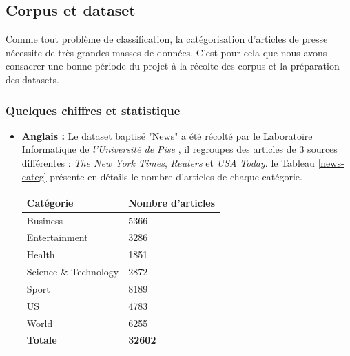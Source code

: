    \subsection{Corpus et dataset}
        Comme tout problème de classification, la catégorisation d'articles de presse nécessite de très grandes masses de données. C'est pour cela que nous avons consacrer une bonne période du projet à la récolte des corpus et la préparation des datasets.     
        \subsubsection{Quelques chiffres et statistique}
            \begin{itemize}
                \item{\textbf{Anglais : }}
                 Le dataset baptisé "News" a été récolté par le Laboratoire Informatique de \emph{l'Université de Pise} \cite{pise}, il regroupes des articles de 3 sources différentes : \emph{The New York Times}, \emph{Reuters} et \emph{USA Today}. le Tableau \ref{news-categ} présente en détails le nombre d'articles de chaque catégorie.
                \begin{table}[H]
                    \begin{center}
                        \begin{tabular}{|C{5cm}|C{5cm}|}
                            \hline
                            \textbf{Catégorie} &  \textbf{Nombre d'articles} \\
                            \hline
                            Business & 5366 \\
                            \hline
                            Entertainment & 3286 \\
                            \hline
                            Health & 1851 \\
                            \hline
                            Science \& Technology & 2872 \\
                            \hline
                            Sport & 8189 \\
                            \hline
                            US & 4783 \\
                            \hline
                            World & 6255 \\
                            \hline
                            \textbf{Totale} &  \textbf{32602} \\
                            \hline
                        \end{tabular}

\end{center}
\end{table}
\end{itemize}
